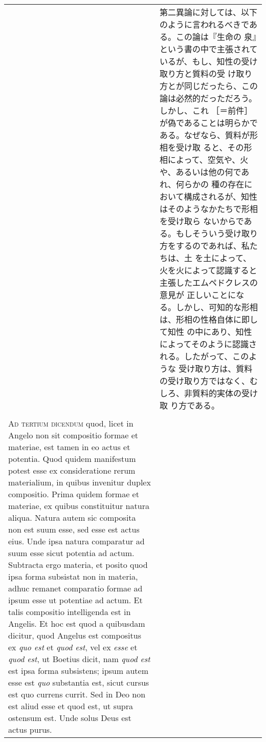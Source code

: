 \documentclass[10pt]{jsarticle} %
\begin{document}
\begin{longtable}{p{21em}p{21em}}
&

 第二異論に対しては、以下のように言われるべきである。この論は『生命の
 泉』という書の中で主張されているが、もし、知性の受け取り方と質料の受
 け取り方とが同じだったら、この論は必然的だっただろう。しかし、これ
 ［＝前件］が偽であることは明らかである。なぜなら、質料が形相を受け取
 ると、その形相によって、空気や、火や、あるいは他の何であれ、何らかの
 種の存在において構成されるが、知性はそのようなかたちで形相を受け取ら
 ないからである。もしそういう受け取り方をするのであれば、私たちは、土
 を土によって、火を火によって認識すると主張したエムペドクレスの意見が
 正しいことになる。しかし、可知的な形相は、形相の性格自体に即して知性
 の中にあり、知性によってそのように認識される。したがって、このような
 受け取り方は、質料の受け取り方ではなく、むしろ、非質料的実体の受け取
 り方である。


\\\\

{\scshape Ad tertium dicendum} quod, licet in Angelo non sit
compositio formae et materiae, est tamen in eo actus et potentia. Quod
quidem manifestum potest esse ex consideratione rerum materialium, in
quibus invenitur duplex compositio. Prima quidem formae et materiae,
ex quibus constituitur natura aliqua. Natura autem sic composita non
est suum esse, sed esse est actus eius. Unde ipsa natura comparatur ad
suum esse sicut potentia ad actum. Subtracta ergo materia, et posito
quod ipsa forma subsistat non in materia, adhuc remanet comparatio
formae ad ipsum esse ut potentiae ad actum. Et talis compositio
intelligenda est in Angelis. Et hoc est quod a quibusdam dicitur, quod
Angelus est compositus ex {\itshape quo est} et {\itshape quod est},
vel ex {\itshape esse} et {\itshape quod est}, ut Boetius dicit, nam
{\itshape quod est} est ipsa forma subsistens; ipsum autem esse est
{\itshape quo} substantia est, sicut cursus est quo currens
currit. Sed in Deo non est aliud esse et quod est, ut supra ostensum
est. Unde solus Deus est actus purus.


 &


\end{longtable}
\end{document}
